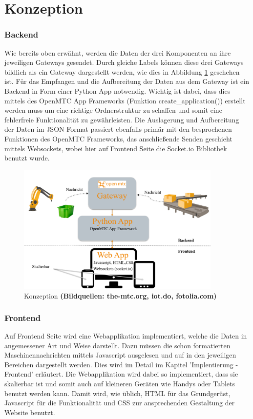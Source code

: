 \documentclass[
	12pt,								%
	DIV10,
	a4paper,         		%
	oneside,						%
	parskip=half,				%
	headings=normal,			%
	listof=totoc,					%
	bibliography=totoc,						%
	index=totoc,						%
	final								%
]{scrartcl}
\begin{document}
\newpage




\section{Konzeption}
\subsubsection*{Backend}
Wie bereits oben erwähnt, werden die Daten der drei Komponenten an ihre jeweiligen Gateways gesendet. Durch gleiche Labels können diese drei Gateways bildlich als ein Gateway dargestellt werden, wie dies in Abbildung \ref{concept} geschehen ist. Für das Empfangen und die Aufbereitung der Daten aus dem Gateway ist ein Backend in Form einer Python App notwendig. Wichtig ist dabei, dass dies mittels des OpenMTC App Frameworks (Funktion create\_application()) erstellt werden muss um eine richtige Ordnerstruktur zu schaffen und somit eine fehlerfreie Funktionalität zu gewährleisten. Die Auslagerung und Aufbereitung der Daten im JSON Format passiert ebenfalls primär mit den besprochenen Funktionen des OpenMTC Frameworks, das anschließende Senden geschieht mittels Websockets, wobei hier auf Frontend Seite die Socket.io Bibliothek benutzt wurde. 



\begin{figure}[H]
\centering
\includegraphics[width=0.9\textwidth]{concept}
\caption{Konzeption \textbf{(Bildquellen: the-mtc.org, iot.do, fotolia.com)}}
\label{concept}
\end{figure}
\subsubsection*{Frontend}
Auf Frontend Seite wird eine Webapplikation implementiert, welche die Daten in angemessener Art und Weise darstellt. Dazu müssen die schon formatierten Maschinennachrichten mittels Javascript ausgelesen und auf in den jeweiligen Bereichen dargestellt werden. Dies wird im Detail im Kapitel 'Implentierung - Frontend' erläutert. Die Webapplikation wird dabei so implementiert, dass sie skalierbar ist und somit auch auf kleineren Geräten wie Handys oder Tablets benutzt werden kann.
Damit wird, wie üblich, HTML für das Grundgerüst, Javascript für die Funktionalität und CSS zur ansprechenden Gestaltung der Website benutzt. 
\newpage
\end{document}
